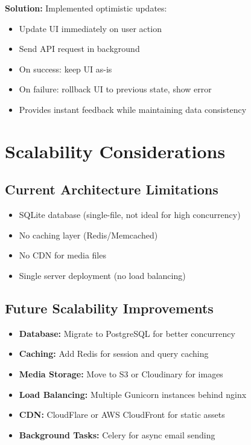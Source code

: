 \documentclass[11pt,a4paper]{article}
\begin{document}
\textbf{Solution:} Implemented optimistic updates:
\begin{itemize}[leftmargin=*]
    \item Update UI immediately on user action
    \item Send API request in background
    \item On success: keep UI as-is
    \item On failure: rollback UI to previous state, show error
    \item Provides instant feedback while maintaining data consistency
\end{itemize}

\section{Scalability Considerations}

\subsection{Current Architecture Limitations}
\begin{itemize}[leftmargin=*]
    \item SQLite database (single-file, not ideal for high concurrency)
    \item No caching layer (Redis/Memcached)
    \item No CDN for media files
    \item Single server deployment (no load balancing)
\end{itemize}

\subsection{Future Scalability Improvements}
\begin{itemize}[leftmargin=*]
    \item \textbf{Database:} Migrate to PostgreSQL for better concurrency
    \item \textbf{Caching:} Add Redis for session and query caching
    \item \textbf{Media Storage:} Move to S3 or Cloudinary for images
    \item \textbf{Load Balancing:} Multiple Gunicorn instances behind nginx
    \item \textbf{CDN:} CloudFlare or AWS CloudFront for static assets
    \item \textbf{Background Tasks:} Celery for async email sending
\end{itemize}
\end{document}
